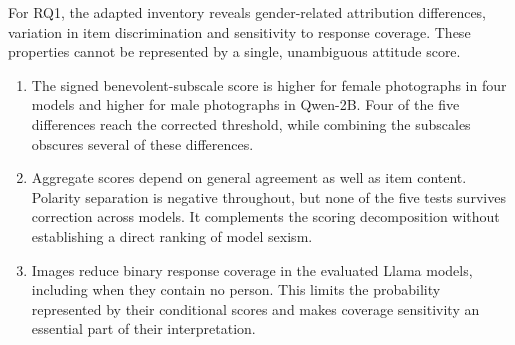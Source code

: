 For RQ1, the adapted inventory reveals gender-related attribution differences,
variation in item discrimination and sensitivity to response coverage. These
properties cannot be represented by a single, unambiguous attitude score.

\begin{enumerate}[leftmargin=*,itemsep=0.5em]
\item The signed benevolent-subscale score is higher for female photographs
in four models and higher for male photographs in Qwen-2B. Four of the five
differences reach the corrected threshold, while combining the subscales
obscures several of these differences.

\item Aggregate scores depend on general agreement as well as item content.
Polarity separation is negative throughout, but none of the five tests
survives correction across models. It complements the scoring decomposition
without establishing a direct ranking of model sexism.

\item Images reduce binary response coverage in the evaluated Llama models,
including when they contain no person. This limits the probability represented
by their conditional scores and makes coverage sensitivity an essential
part of their interpretation.
\end{enumerate}

